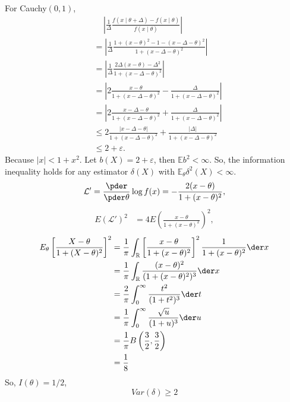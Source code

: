 \begin{solution}
    For Cauchy$(0,1)$, 
    \begin{align*}
        &\quad\,\left|\frac{1}{\Delta} \frac{f(x \mid \theta+\Delta)-f(x \mid \theta)}{f(x \mid \theta)}\right|  \\
        &= \left|\frac{1}{\Delta} \frac{1+(x-\theta)^2-1-(x-\Delta-\theta)^2}{1+(x-\Delta-\theta)^2}\right|\\
        &= \left|\frac{1}{\Delta} \frac{2\Delta(x-\theta)-\Delta^2}{1+(x-\Delta-\theta)^2}\right|\\
        &= \left|2\frac{x-\theta}{1+(x-\Delta-\theta)^2}-\frac{\Delta}{1+(x-\Delta-\theta)^2}\right|\\
        &= \left|2\frac{x-\Delta-\theta}{1+(x-\Delta-\theta)^2}+\frac{\Delta}{1+(x-\Delta-\theta)^2}\right|\\
        &\leqslant2\frac{|x-\Delta-\theta|}{1+(x-\Delta-\theta)^2}+\frac{|\Delta|}{1+(x-\Delta-\theta)^2}\\
        &\leqslant2+\varepsilon. 
    \end{align*}
    Because $|x|<1+x^2$. Let $b(X)=2+\varepsilon$, then $\mathbb{E}b^2<\infty$. So, the information inequality holds for any estimator $\delta(X)$ with $\mathbb{E}_{\theta} \delta^{2}(X)<\infty$.
    \[
        \mathcal{L}'=\frac{\pder}{\pder \theta}\log f(x)=-\frac{2(x-\theta)}{1+(x-\theta)^2}, 
    \]
    \[
        \begin{aligned}
            E\left(\mathcal{L}'\right)^2&=4E\left(\frac{x-\theta}{1+(x-\theta)^2}\right)^2, 
        \end{aligned}
    \]
    \[
        \begin{aligned}
            E_{\theta}\left[\frac{X-\theta}{1+(X-\theta)^2}\right]^2
            &=\frac{1}{\pi}\int_{\mathbb R}\left[\frac{x-\theta}{1+(x-\theta)^2}\right]^2\frac{1}{1+(x-\theta)^2}\der x
            \\&=\frac{1}{\pi}\int_{\mathbb R}\frac{(x-\theta)^2}{(1+(x-\theta)^2)^3}\der x\\&=\frac{2}{\pi}\int_0^\infty\frac{t^2}{(1+t^2)^3}\der t
            \\&=\frac{1}{\pi}\int_0^\infty\frac{\sqrt u}{(1+u)^3}\der u
            \\&=\frac{1}{\pi}B\left(\frac{3}{2},\frac{3}{2}\right)
            \\&=\frac{1}{8}
        \end{aligned}
    \]
    So, $I(\theta)=1/2$, 
    \[
        Var(\delta)\geqslant2
    \]
\end{solution}

